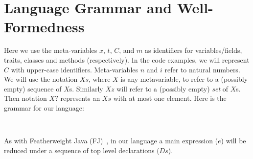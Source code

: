 \section{Language Grammar and Well-Formedness}
Here we use the meta-variables $x$, $t$, $C$, and $m$ as identifiers for variables/fields, traits, classes and methods (respectively). In the code examples, we will represent $C$ with upper-case identifiers. Meta-variables $n$ and $i$ refer to natural numbers. We will use the notation $Xs$, where $X$ is any metavariable, to refer to a (possibly empty) sequence of $X$s. Similarly $Xz$ will refer to a (possibly empty) \emph{set} of $X$s. Then notation $X?$ represents an $Xs$ with at most one element. Here is the grammar for our language:

\noindent
\newlength{\gramwidth}
\setlength{\gramwidth}{\dimexpr\textwidth-1em}
\begin{minipage}[t]{0.6\gramwidth}
\begin{grammar}
\end{grammar}
\end{minipage}\hfil
\begin{minipage}[t]{0.4\gramwidth}
\begin{grammar}
	\\
\end{grammar}
\end{minipage}
As with Featherweight Java (FJ)~\cite{?}, in our language a main expression ($e$) will be reduced under a sequence of top level declarations ($Ds$).


